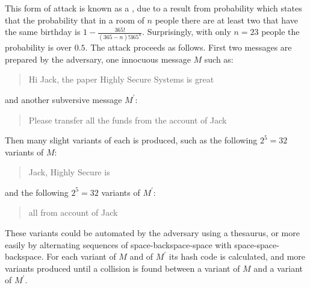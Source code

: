 This form of attack is known as a , due to a result
from probability which states that the probability that in a room of $n$ people
there are at least two that have the same birthday is
$1-\frac{365!}{(365-n)!365^n}$.
Surprisingly, with only $n=23$ people the probability is over $0.5$.
The attack proceeds as follows. First two messages are prepared by the adversary,
one innocuous message $M$ such as:
\begin{quote}\begin{code}
Hi Jack, the paper Highly Secure Systems is great
\end{code}\end{quote}
and another subversive message $M^\prime$:
\begin{quote}\begin{code}
Please transfer all the funds from the account of Jack
\end{code}\end{quote}
Then many slight variants of each is produced, such as the following $2^5=32$ variants of $M$:
\begin{quote}\begin{code}
 Jack,  
Highly Secure  is 
\end{code}\end{quote}
and the following $2^5=32$ variants of $M^\prime$:
\begin{quote}\begin{code}
  all
  from
 account of Jack
\end{code}\end{quote}
These variants could be automated by the adversary using a thesaurus, or more easily
by alternating sequences of space-backspace-space with space-space-backspace.
For each variant of $M$ and of $M^\prime$ its hash code is calculated, and more variants
produced until a collision is found between a variant of $M$ and a variant of $M^\prime$.

